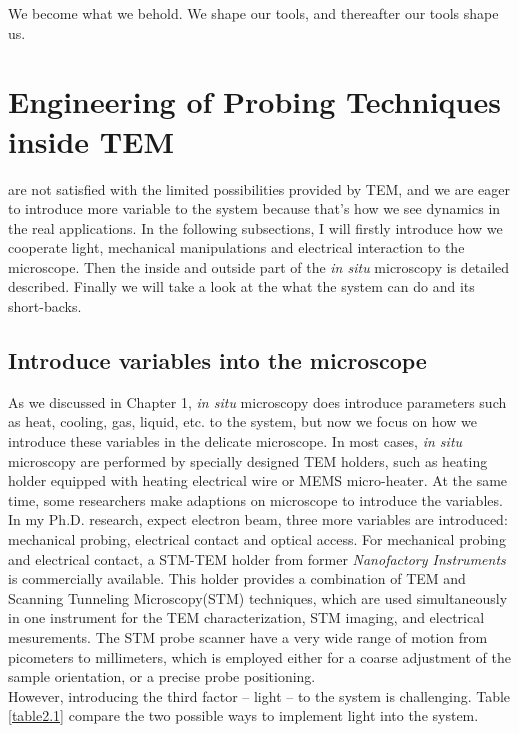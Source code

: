 

\begin{savequote}[75mm] 
We become what we behold. We shape our tools, and thereafter our tools shape us.
\end{savequote}

\chapter{Engineering of Probing Techniques inside TEM}

 are not satisfied with the limited possibilities provided by TEM, and we are eager to introduce more variable to the system because that's how we see dynamics in the real applications. In the following subsections, I will firstly introduce how we cooperate light, mechanical manipulations and electrical interaction to the microscope. Then the inside and outside part of the \emph{in situ} microscopy is detailed described. Finally we will take a look at the what the system can do and its short-backs. 

\section{Introduce variables into the microscope}
As we discussed in Chapter 1, \emph{in situ} microscopy does introduce parameters such as heat, cooling, gas, liquid, etc. to the system, but now we focus on how we introduce these variables in the delicate microscope. In most cases, {\em in situ} microscopy are performed by specially designed TEM holders, such as heating holder equipped with heating electrical wire or MEMS micro-heater. At the same time, some researchers make adaptions on microscope to introduce the variables. In my Ph.D. research, expect electron beam, three more variables are introduced: mechanical probing, electrical contact and optical access. For mechanical probing and electrical contact, a STM-TEM holder from former {\em Nanofactory Instruments} is commercially available. This holder provides a combination of TEM and Scanning Tunneling Microscopy(STM) techniques, which are used simultaneously in one instrument for the TEM characterization, STM imaging, and electrical mesurements. The STM probe scanner have a very wide range of motion from picometers to millimeters, which is employed either for a coarse adjustment of the sample orientation, or a precise probe positioning. \\
However, introducing the third factor -- light -- to the system is challenging. Table \ref{table2.1} compare the two possible ways to implement light into the system. 

